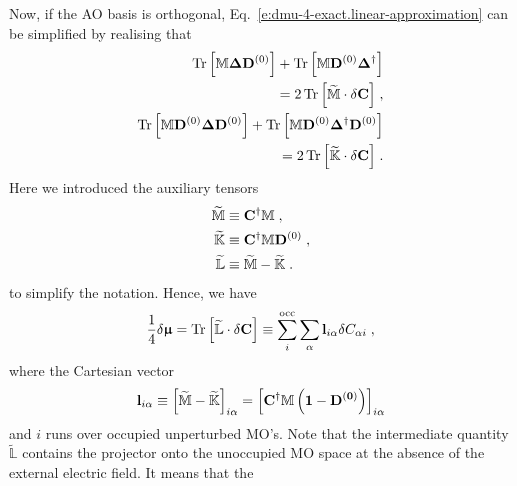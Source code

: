 \documentclass[aip,amsmath,amssymb,reprint,floatfix]{revtex4-1}
\newcommand{\BM}[1]{\bm{#1}}
\DeclareMathOperator{\Tr}{Tr}
\begin{document}
Now, if the AO basis is orthogonal, Eq.~\eqref{e:dmu-4-exact.linear-approximation} can be simplified by realising that
%
\begin{subequations}
 \begin{align}
  \Tr{ 
    \left[ 
         {\mathbb{M}} {\BM\Delta} {\bf D}^{(0)}  
    \right] }
%
  +\Tr{ 
    \left[ 
         {\mathbb{M}} {\bf D}^{(0)} {\BM\Delta}^{\dagger}
    \right] }
  & \\ \nonumber =
2 \Tr{ 
    \left[ 
         \widetilde{\mathbb{M}} \cdot \delta {\bf C}
   \right] }  \;,
%
\\
%
  \Tr{ 
    \left[ 
         {\mathbb{M}} {\bf D}^{(0)} {\BM\Delta} {\bf D}^{(0)}
    \right] }
%
 +\Tr{ 
    \left[ 
         {\mathbb{M}} {\bf D}^{(0)} {\BM\Delta}^{\dagger} {\bf D}^{(0)}
    \right] }
  & \\ \nonumber =
2 \Tr{ 
    \left[ 
         \widetilde{\mathbb{K}} \cdot \delta {\bf C}
   \right] } \;.
%
 \end{align}
\end{subequations}
%
Here we introduced the auxiliary tensors
%
\begin{subequations}
 \begin{align}
   \widetilde{\mathbb{M}}  &\equiv {\bf C}^\dagger {\mathbb{M}}     \;,           \\
   \widetilde{\mathbb{K}}  &\equiv {\bf C}^\dagger {\mathbb{M}} {\bf D}^{(0)} \;, \\
   \widetilde{\mathbb{L}}  &\equiv \widetilde{\mathbb{M}} - \widetilde{\mathbb{K}} \;.
 \end{align}
\end{subequations}
%
to simplify the notation. Hence, we have
%
\begin{equation} \label{e:dmu-l-vector}
  \frac{1}{4} 
 \delta {\BM{\upmu}} %
   =
   \Tr{ 
    \left[ 
         \widetilde{\mathbb{L}} \cdot \delta {\bf C}
    \right] }
   \equiv \sum_{i}^{\rm occ} \sum_\alpha {\bf l}_{i\alpha} \delta C_{\alpha i} \;,
\end{equation}
%
where the Cartesian vector
%
\begin{equation}\label{e:l-vector}
 {\bf l}_{i\alpha} \equiv \left[ \widetilde{\mathbb{M}} - \widetilde{\mathbb{K}} \right]_{i\alpha} 
      = \left[  {\bf C}^\dagger \mathbb{M} \left( \bf{1} - \bf{D}^{(0)} \right) \right]_{i\alpha}
\end{equation}
%
and $i$ runs over occupied unperturbed MO's.
Note that the intermediate quantity $\widetilde{\mathbb{L}}$ contains the projector onto
the unoccupied MO space at the absence of the external electric field. It means that the
\end{document}

